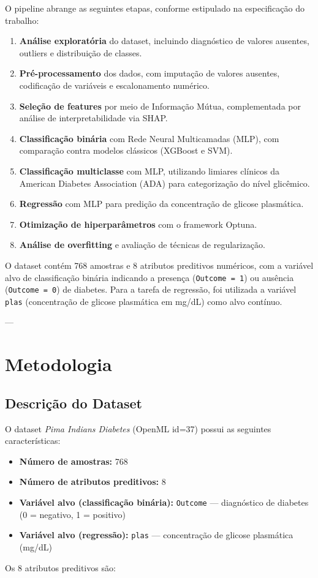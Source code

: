 \documentclass[12pt]{article}
\begin{document}
O pipeline abrange as seguintes etapas, conforme estipulado na especificação do trabalho:

\begin{enumerate}
\item \textbf{Análise exploratória} do dataset, incluindo diagnóstico de valores ausentes, outliers e distribuição de classes.
\item \textbf{Pré-processamento} dos dados, com imputação de valores ausentes, codificação de variáveis e escalonamento numérico.
\item \textbf{Seleção de features} por meio de Informação Mútua, complementada por análise de interpretabilidade via SHAP.
\item \textbf{Classificação binária} com Rede Neural Multicamadas (MLP), com comparação contra modelos clássicos (XGBoost e SVM).
\item \textbf{Classificação multiclasse} com MLP, utilizando limiares clínicos da American Diabetes Association (ADA) para categorização do nível glicêmico.
\item \textbf{Regressão} com MLP para predição da concentração de glicose plasmática.
\item \textbf{Otimização de hiperparâmetros} com o framework Optuna.
\item \textbf{Análise de overfitting} e avaliação de técnicas de regularização.

\end{enumerate}
O dataset contém 768 amostras e 8 atributos preditivos numéricos, com a variável alvo de classificação binária indicando a presença (\texttt{Outcome = 1}) ou ausência (\texttt{Outcome = 0}) de diabetes. Para a tarefa de regressão, foi utilizada a variável \texttt{plas} (concentração de glicose plasmática em mg/dL) como alvo contínuo.

---

\section{Metodologia}

\subsection{Descrição do Dataset}

O dataset \textit{Pima Indians Diabetes} (OpenML id=37) possui as seguintes características:

\begin{itemize}
\item \textbf{Número de amostras:} 768
\item \textbf{Número de atributos preditivos:} 8
\item \textbf{Variável alvo (classificação binária):} \texttt{Outcome} --- diagnóstico de diabetes (0 = negativo, 1 = positivo)
\item \textbf{Variável alvo (regressão):} \texttt{plas} --- concentração de glicose plasmática (mg/dL)

\end{itemize}
Os 8 atributos preditivos são:
\end{document}
